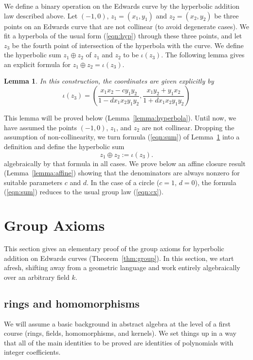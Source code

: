 \documentclass[12pt]{article}
\newtheorem{lemma}[theorem]{Lemma}
\begin{document}
We define a binary operation on the Edwards curve by the hyperbolic
addition law described above.  Let $(-1,0)$, $z_1 = (x_1,y_1)$ and
$z_2=(x_2,y_2)$ be three points on an Edwards curve that are not
collinear (to avoid degenerate cases).  We fit a hyperbola of the
usual form (\ref{eqn:hyp}) through these three points, and let $z_3$
be the fourth point of intersection of the hyperbola with the curve.
We define the hyperbolic sum $z_1\oplus z_2$ of $z_1$ and $z_2$ to be
$\iota(z_3)$.  The following lemma gives an explicit formula for
$z_1\oplus z_2 = \iota(z_3)$.
 
 \begin{lemma}\label{lemma:hyp} 
In this construction, the coordinates are given explicitly by
 \begin{equation}\label{eqn:sum}
 \iota(z_3) = \left(\frac{x_1 x_2 - c y_1 y_2}{1 - d x_1 x_2 y_1 y_2},
\frac{x_1 y_2 + y_1 x_2}{1+d x_1 x_2 y_1 y_2}\right)
 \end{equation}
 \end{lemma}

 This lemma will be proved below (Lemma~\ref{lemma:hyperbola}).  Until
 now, we have assumed the points $(-1,0)$, $z_1$, and $z_2$ are not
 collinear.  Dropping the assumption of non-collinearity, we turn
 formula (\ref{eqn:sum}) of Lemma~\ref{lemma:hyp} into a definition
 and define the hyperbolic sum
\[
 z_1\oplus z_2 := \iota(z_3).
\]
algebraically by that formula in all cases.  We prove below an affine
closure result (Lemma~\ref{lemma:affine}) showing that the
denominators are always nonzero for suitable parameters $c$ and $d$.
In the case of a circle ($c=1$, $d=0$), the formula (\ref{eqn:sum})
reduces to the usual group law (\ref{eqn:cx}).


\section{Group Axioms}\label{sec:axiom}

This section gives an elementary proof of the group axioms for
hyperbolic addition on Edwards curves (Theorem~\ref{thm:group}).  In
this section, we start afresh, shifting away from a geometric language
and work entirely algebraically over an arbitrary field $k$.

\subsection{rings and homomorphisms}

We will assume a basic background in abstract algebra at the level of
a first course (rings, fields, homomorphisms, and kernels).  We set
things up in a way that all of the main identities to be proved are
identities of polynomials with integer coefficients.
\end{document}
